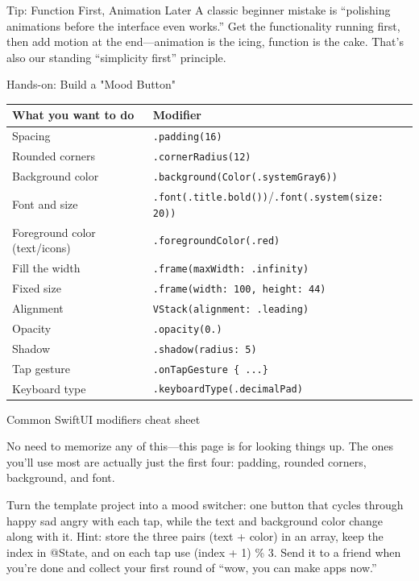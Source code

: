 \begin{tcbinfo}{Tip: Function First, Animation Later}
A classic beginner mistake is “polishing animations before the interface even works.” Get the functionality running first, then add motion at the end—animation is the icing, function is the cake. That's also our standing “simplicity first” principle.

\end{tcbinfo}

\begin{tcbpractice}{Hands-on: Build a "Mood Button"}

\begin{center}
\begin{tabularx}{\linewidth}{|X|X|}
\hline
\textbf{What you want to do} & \textbf{Modifier} \tabularnewline
\hline
Spacing & \texttt{.\allowbreak padding(16)} \tabularnewline
Rounded corners & \texttt{.\allowbreak cornerRadius(12)} \tabularnewline
Background color & \texttt{.\allowbreak background(Color(.\allowbreak systemGray6))} \tabularnewline
Font and size & \texttt{.\allowbreak font(.\allowbreak title.\allowbreak bold())}/\texttt{.\allowbreak font(.\allowbreak system(size: 20))} \tabularnewline
Foreground color (text/icons) & \texttt{.\allowbreak foregroundColor(.\allowbreak red)} \tabularnewline
Fill the width & \texttt{.\allowbreak frame(maxWidth: .\allowbreak infinity)} \tabularnewline
Fixed size & \texttt{.\allowbreak frame(width: 100, height: 44)} \tabularnewline
Alignment & \texttt{VStack(alignment: .\allowbreak leading)} \tabularnewline
Opacity & \texttt{.\allowbreak opacity(0.\allowbreak 6)} \tabularnewline
Shadow & \texttt{.\allowbreak shadow(radius: 5)} \tabularnewline
Tap gesture & \texttt{.\allowbreak onTapGesture \{ .\allowbreak .\allowbreak .\allowbreak  \}} \tabularnewline
Keyboard type & \texttt{.\allowbreak keyboardType(.\allowbreak decimalPad)} \tabularnewline
\hline
\end{tabularx}
\end{center}

\begin{center}\small\color{gray}Common SwiftUI modifiers cheat sheet\end{center}

No need to memorize any of this—this page is for looking things up. The ones you'll use most are actually just the first four: padding, rounded corners, background, and font.

Turn the template project into a mood switcher: one button that cycles through happy sad angry with each tap, while the text and background color change along with it. Hint: store the three pairs (text + color) in an array, keep the index in @State, and on each tap use (index + 1) \% 3. Send it to a friend when you're done and collect your first round of “wow, you can make apps now.”

\end{tcbpractice}

